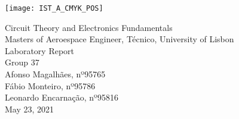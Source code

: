 
\thispagestyle {empty}

\texttt{[image: IST\_A\_CMYK\_POS]}

\begin{center}
%
\vspace{1.0cm}
\vspace{1cm}
{\FontLb Circuit Theory and Electronics Fundamentals} \\
\vspace{1cm}
{\FontSn Masters of Aeroespace Engineer, Técnico, University of Lisbon} \\ 
\vspace{1cm}
{\FontSn Laboratory Report} \\
\vspace{5mm}
{\FontSn Group 37} \\
\vspace{1cm}
{\FontSn Afonso Magalhães, nº95765}\\ 
{\FontSn Fábio Monteiro, nº95786}\\
{\FontSn Leonardo Encarnação, nº95816}\\
\vspace{14cm}
{\FontSn May 23, 2021}  
\end{center}

\newpage

